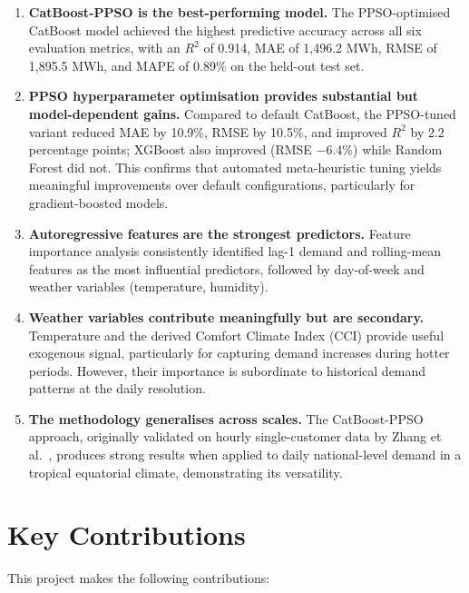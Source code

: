 \begin{enumerate}
    \item \textbf{CatBoost-PPSO is the best-performing model.} The PPSO-optimised CatBoost model achieved the highest predictive accuracy across all six evaluation metrics, with an $R^2$ of 0.914, MAE of 1{,}496.2 MWh, RMSE of 1{,}895.5 MWh, and MAPE of 0.89\% on the held-out test set.
    
    \item \textbf{PPSO hyperparameter optimisation provides substantial but model-dependent gains.} Compared to default CatBoost, the PPSO-tuned variant reduced MAE by 10.9\%, RMSE by 10.5\%, and improved $R^2$ by 2.2 percentage points; XGBoost also improved (RMSE $-$6.4\%) while Random Forest did not. This confirms that automated meta-heuristic tuning yields meaningful improvements over default configurations, particularly for gradient-boosted models.
    
    \item \textbf{Autoregressive features are the strongest predictors.} Feature importance analysis consistently identified lag-1 demand and rolling-mean features as the most influential predictors, followed by day-of-week and weather variables (temperature, humidity).
    
    \item \textbf{Weather variables contribute meaningfully but are secondary.} Temperature and the derived Comfort Climate Index (CCI) provide useful exogenous signal, particularly for capturing demand increases during hotter periods. However, their importance is subordinate to historical demand patterns at the daily resolution.
    
    \item \textbf{The methodology generalises across scales.} The CatBoost-PPSO approach, originally validated on hourly single-customer data by Zhang et al.\ \parencite{zhang2023catboostppso}, produces strong results when applied to daily national-level demand in a tropical equatorial climate, demonstrating its versatility.
\end{enumerate}


\section{Key Contributions}

This project makes the following contributions:

